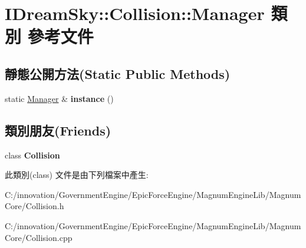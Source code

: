 \hypertarget{class_i_dream_sky_1_1_collision_1_1_manager}{}\section{I\+Dream\+Sky\+:\+:Collision\+:\+:Manager 類別 參考文件}
\label{class_i_dream_sky_1_1_collision_1_1_manager}
\subsection*{靜態公開方法(Static Public Methods)}
\begin{DoxyCompactItemize}
\item 
static \hyperlink{class_i_dream_sky_1_1_collision_1_1_manager}{Manager} \& {\bfseries instance} ()\hypertarget{class_i_dream_sky_1_1_collision_1_1_manager_a207a47f946ceb2f3bb62476eb867eb0e}{}\label{class_i_dream_sky_1_1_collision_1_1_manager_a207a47f946ceb2f3bb62476eb867eb0e}

\end{DoxyCompactItemize}
\subsection*{類別朋友(Friends)}
\begin{DoxyCompactItemize}
\item 
class {\bfseries Collision}\hypertarget{class_i_dream_sky_1_1_collision_1_1_manager_aa08e39e5a8a0a97f10c15f0c5d98013b}{}\label{class_i_dream_sky_1_1_collision_1_1_manager_aa08e39e5a8a0a97f10c15f0c5d98013b}

\end{DoxyCompactItemize}


此類別(class) 文件是由下列檔案中產生\+:\begin{DoxyCompactItemize}
\item 
C\+:/innovation/\+Government\+Engine/\+Epic\+Force\+Engine/\+Magnum\+Engine\+Lib/\+Magnum\+Core/Collision.\+h\item 
C\+:/innovation/\+Government\+Engine/\+Epic\+Force\+Engine/\+Magnum\+Engine\+Lib/\+Magnum\+Core/Collision.\+cpp\end{DoxyCompactItemize}
